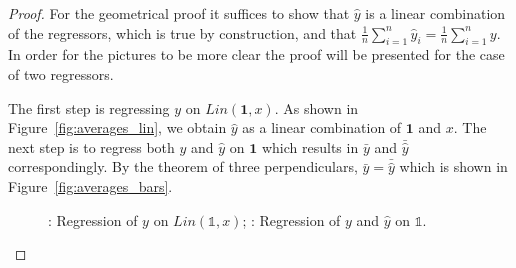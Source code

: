 \documentclass[nobib]{tufte-handout}
\theoremstyle{definition}
\begin{document}
\begin{proof}
For the geometrical proof it suffices to show that $\hat y$ is a linear combination of the regressors, which is true by construction,
and that $\frac{1}{n} \sum_{i=1}^{n} \hat y_i = \frac{1}{n} \sum_{i=1}^{n} y$. In order for the pictures to be more clear the proof will be presented for the case of two regressors.

The first step is regressing $y$ on $Lin(\mathbf{1}, x)$. As shown in Figure~\ref{fig:averages_lin}, we obtain $\hat y$ as a linear combination of $\mathbf{1}$ and $x$.
The next step is to regress both $y$ and $\hat y$ on $\mathbf{1}$ which results in $\bar y$ and $\bar \hat y$ correspondingly.
By the theorem of three perpendiculars, $\bar y = \bar \hat y$ which is shown in Figure~\ref{fig:averages_bars}.

\begin{figure}[ht!]
\begin{center}
\hspace{4ex}
\caption{: Regression of $y$ on $Lin(\mathbb{1},x)$; : Regression of $y$ and $\hat y$ on $\mathbb{1}$.}
\end{center}
\end{figure}



\end{proof}
\end{document}
